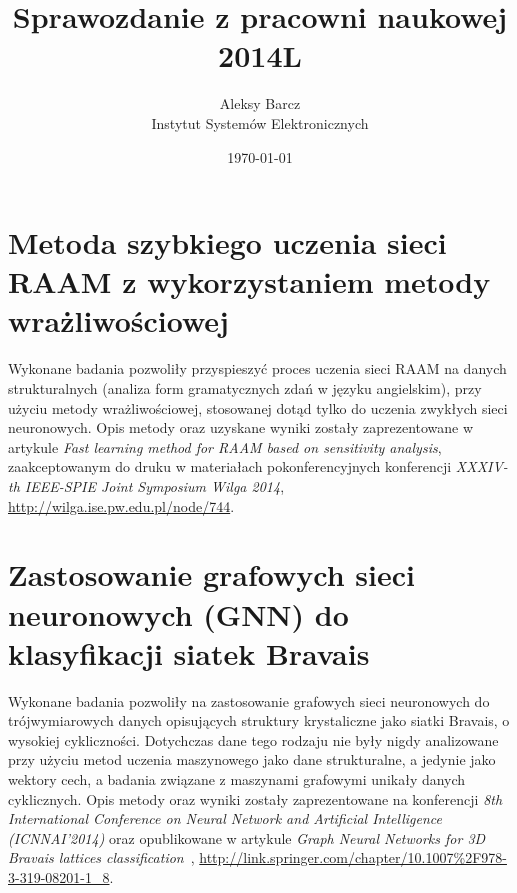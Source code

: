 \documentclass[11pt,a4paper]{article}
\date {\today}
\author {
Aleksy Barcz\\
Instytut Systemów Elektronicznych
}
\title{\vspace{60mm} \textbf{Sprawozdanie z pracowni naukowej} \\ 2014L}
\begin{document}
\maketitle
\thispagestyle{empty}

\newpage

\section{Metoda szybkiego uczenia sieci RAAM z wykorzystaniem metody wrażliwościowej}
Wykonane badania pozwoliły przyspieszyć proces uczenia sieci RAAM na danych strukturalnych (analiza form gramatycznych zdań w języku angielskim), przy użyciu metody wrażliwościowej, stosowanej dotąd tylko do uczenia zwykłych sieci neuronowych. Opis metody oraz uzyskane wyniki zostały zaprezentowane w artykule \emph{Fast learning method for RAAM based on sensitivity analysis}, zaakceptowanym do druku w materiałach pokonferencyjnych konferencji \emph{XXXIV-th IEEE-SPIE Joint Symposium Wilga 2014}, \url{http://wilga.ise.pw.edu.pl/node/744}.

\section{Zastosowanie grafowych sieci neuronowych (GNN) do klasyfikacji siatek Bravais}
Wykonane badania pozwoliły na zastosowanie grafowych sieci neuronowych do trójwymiarowych danych opisujących struktury krystaliczne jako siatki Bravais, o wysokiej cykliczności. Dotychczas dane tego rodzaju nie były nigdy analizowane przy użyciu metod uczenia maszynowego jako dane strukturalne, a jedynie jako wektory cech, a badania związane z maszynami grafowymi unikały danych cyklicznych. Opis metody oraz wyniki zostały zaprezentowane na konferencji \emph{8th International Conference on Neural Network and Artificial Intelligence (ICNNAI'2014)} oraz opublikowane w artykule \emph{Graph Neural Networks for 3D Bravais lattices classification}~\cite{barcz2014graph}, \url{http://link.springer.com/chapter/10.1007%2F978-3-319-08201-1_8}.



\end{document}
